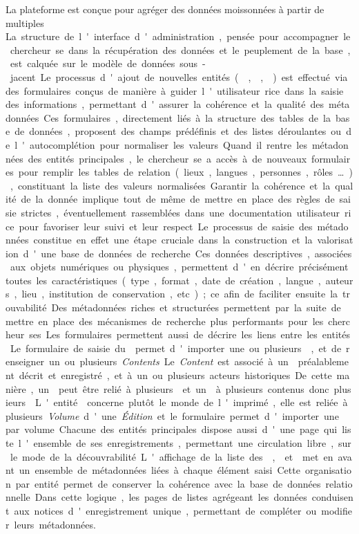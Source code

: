 La plateforme \aikon est conçue pour agréger des données moissonnées à
partir de multiples \si. La structure de l'interface
d'administration, pensée pour accompagner le chercheur.se dans la
récupération des données et le peuplement de la base, est calquée sur le modèle
de données sous-jacent.

Le processus d'ajout de nouvelles entités (\wit, \ser, \wo) est
effectué via des formulaires conçus de manière à guider l'utilisateur.rice dans
la saisie des informations, permettant d'assurer la cohérence et la
qualité des métadonnées. Ces formulaires, directement liés à la
structure des tables de la base de données, proposent des champs
prédéfinis et des listes déroulantes ou de l'autocomplétion pour
normaliser les valeurs. Quand il rentre les métadonnées des entités
principales, le chercheur.se a accès à de nouveaux formulaires pour remplir
les tables de relation (lieux, langues, personnes, rôles\ldots),
constituant la liste des valeurs normalisées. Garantir la cohérence et
la qualité de la donnée implique tout de même de mettre en place des
règles de saisie strictes, éventuellement rassemblées dans une
documentation utilisateur.rice pour favoriser leur suivi et leur respect.

Le processus de saisie des métadonnées constitue en effet une étape
cruciale dans la construction et la valorisation d'une base de données
de recherche. Ces données descriptives, associées aux objets numériques
ou physiques, permettent d'en décrire précisément toutes les
caractéristiques (type, format, date de création, langue, auteurs, lieu,
institution de conservation, etc.)~; ce afin de faciliter ensuite la
trouvabilité. Des métadonnées riches et structurées permettent par la
suite de mettre en place des mécanismes de recherche plus performants
pour les chercheur.ses.

Les formulaires permettent aussi de décrire les liens entre les entités.
Le formulaire de saisie du \wit permet d'importer une ou plusieurs
\digits, et de renseigner un ou plusieurs \textit{Contents}. Le \textit{Content} est
associé à un \wo préalablement décrit et enregistré, et à un ou
plusieurs acteurs historiques. De cette manière, un \wo peut être relié
à plusieurs \wits et un \wit à plusieurs contenus donc
plusieurs \wos. L'entité \ser concerne plutôt le monde de l'imprimé,
elle est reliée à plusieurs \textit{Volume} d'une \textit{Édition} et le formulaire permet
d'importer une \digit par volume.

Chacune des entités principales dispose aussi d'une page qui liste
l'ensemble de ses enregistrements, permettant une circulation libre, sur
le mode de la découvrabilité. L'affichage de la liste des \wits,
\sers et \wos met en avant un ensemble de métadonnées liées à chaque
élément saisi. Cette organisation par entité permet de conserver la
cohérence avec la base de données relationnelle. Dans cette logique, les
pages de listes agrégeant les données conduisent aux notices
d'enregistrement unique, permettant de compléter ou modifier leurs
métadonnées.

